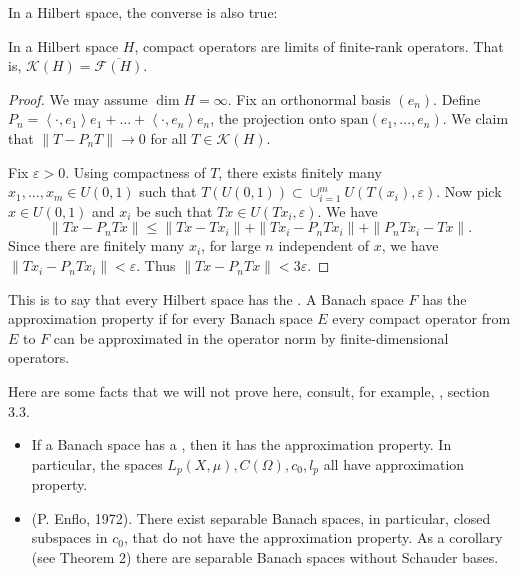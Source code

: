 In a Hilbert space, the converse is also true:
\begin{proposition}
	\label{prop:CompactOperatorLimit}
	In a Hilbert space $H$, compact operators are limits of finite-rank operators. That is, $\mathcal{K}(H) = \overline{\mathcal{F}(H)} $.
\end{proposition}
\begin{proof}
	We may assume $\operatorname{dim} H = \infty $. Fix an orthonormal basis $(e_n)$. Define $P_n = \left\langle \cdot , e_1 \right\rangle e_1 + \ldots + \left\langle \cdot , e_n \right\rangle e_n$, the projection onto $\text{span}(e_1, \ldots, e_n)$. We claim that $\|T - P_n T\| \to 0$ for all $T \in \mathcal{K}(H)$.

	Fix $\varepsilon>0$. Using compactness of $T$, there exists finitely many $x_1, \ldots, x_m \in U(0,1)$ such that $T(U(0,1)) \subset \cup_{i = 1}^m U(T(x_i), \varepsilon)$. Now pick $x \in U(0,1)$ and $x_i$ be such that $T x \in U(T x_i, \varepsilon)$. We have
	\[
		\|T x - P_n T x\| \le \|T x - T x_i\| + \|T x_i - P_n T x_i\| + \|P_n T x_i - T x\|
	.\] 
	Since there are finitely many $x_i$, for large $n$ independent of $x$, we have $\|T x_i - P_n T x_i\| < \varepsilon$. Thus $\|T x - P_n T x\| < 3 \varepsilon$.
\end{proof}

This is to say that every Hilbert space has the . A Banach space $F$ has the approximation property if for every Banach space $E$ every compact operator from $E$ to $F$ can be approximated in the operator norm by finite-dimensional operators.

Here are some facts that we will not prove here, consult, for example, \cite{khelemskiiLecturesExercisesFunctional2006}, section 3.3.

\begin{itemize}
	\item If a Banach space has a , then it has the approximation property. In particular, the spaces $L_p(X, \mu), C(\Omega), c_0, l_p$ all have approximation property.
	\item (P. Enflo, 1972). There exist separable Banach spaces, in particular, closed subspaces in $c_0$, that do not have the approximation property. As a corollary (see Theorem 2) there are separable Banach spaces without Schauder bases.
\end{itemize}


